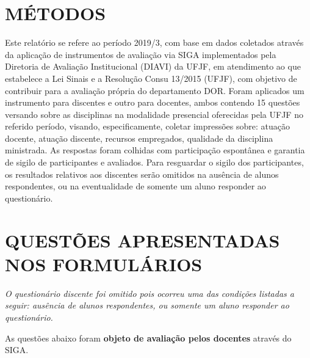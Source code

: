 \documentclass[a4paper,10pt]{article}
\begin{document}
\section{MÉTODOS}
Este relatório se refere ao período 2019/3, com base em dados     coletados através da aplicação de instrumentos de avaliação via SIGA     implementados pela Diretoria de Avaliação Institucional (DIAVI) da UFJF, em atendimento     ao que estabelece a Lei Sinais e a Resolução Consu 13/2015 (UFJF),     com objetivo de contribuir para a avaliação própria do departamento DOR.    Foram aplicados um instrumento para discentes e outro para docentes, ambos contendo     15 questões versando sobre as disciplinas na modalidade presencial oferecidas pela UFJF no     referido período, visando, especificamente, coletar impressões sobre: atuação docente, atuação discente,     recursos empregados, qualidade da disciplina ministrada.     As respostas foram colhidas      com participação espontânea e garantia de    sigilo de participantes e avaliados. Para resguardar o sigilo dos participantes, os resultados relativos aos discentes serão omitidos na ausência de alunos respondentes, ou na eventualidade de somente um aluno responder ao questionário.
\section{QUESTÕES APRESENTADAS NOS FORMULÁRIOS}
{ \it O questionário discente foi omitido pois ocorreu uma das condições listadas a seguir: ausência de alunos respondentes, ou somente um aluno responder ao questionário.}

As questões abaixo foram {\bf objeto de avaliação pelos docentes} através do SIGA.
\end{document}
